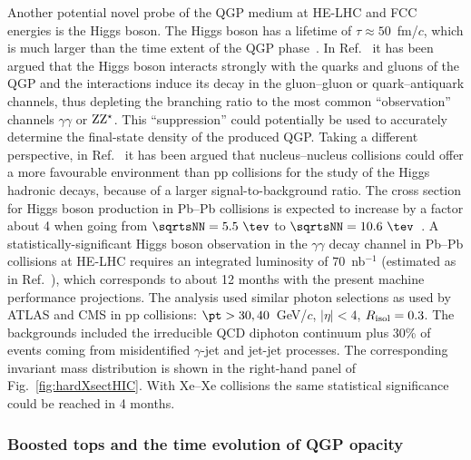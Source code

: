 \documentclass[../report.tex]{subfiles}
\begin{document}
Another potential novel probe of the QGP medium at HE-LHC and FCC energies is the
Higgs boson. The Higgs boson has a lifetime of $\tau\approx 50$~fm/$c$, which is much larger than the 
time extent of the QGP phase~\cite{dEnterria:2018bqi,Berger:2018mtg}. 
In Ref.~\cite{dEnterria:2018bqi}
it has been argued that the Higgs boson
interacts strongly with the quarks and gluons of the QGP and the interactions
induce its decay in the gluon--gluon or quark--antiquark channels, thus depleting the 
branching ratio to the most common ``observation'' channels $\gamma\gamma$ or $\rm ZZ^\star$.
This ``suppression'' could potentially be used 
to accurately determine the final-state density of the produced QGP.
Taking a different perspective, in Ref.~\cite{Berger:2018mtg} it has been argued that nucleus--nucleus collisions could offer a more favourable environment than pp collisions for the study of the Higgs hadronic decays, because of a larger signal-to-background ratio.
The cross section for Higgs boson production in Pb--Pb collisions is expected to
increase by a factor about 4 when going from
$\sqrtsNN=5.5~\tev$ to $\sqrtsNN=10.6~\tev$~\cite{dEnterria:2017jyt}.
A statistically-significant Higgs boson observation in the
$\gamma\gamma$ decay channel in Pb--Pb collisions at HE-LHC 
requires an integrated luminosity of $70$~nb$^{-1}$ 
(estimated as in Ref.~\cite{dEnterria:2017jyt}), which corresponds to about 12 months with the present machine performance
projections. 
The analysis used similar photon selections as used by ATLAS and CMS in pp collisions: 
$\pt > 30,40$~GeV/$c$, $|\eta| < 4$, $R_{\rm isol} = 0.3$. The backgrounds included the irreducible QCD diphoton continuum plus 30\% of events coming from misidentified 
$\gamma$-jet and jet-jet processes. 
The corresponding invariant mass distribution is shown in the right-hand panel of Fig.~\ref{fig:hardXsectHIC}.
With Xe--Xe collisions the same statistical significance could be reached in 4 months.


\subsubsection{Boosted tops and the time evolution of QGP opacity}
\label{sec:HE_boostedtops}
\end{document}
